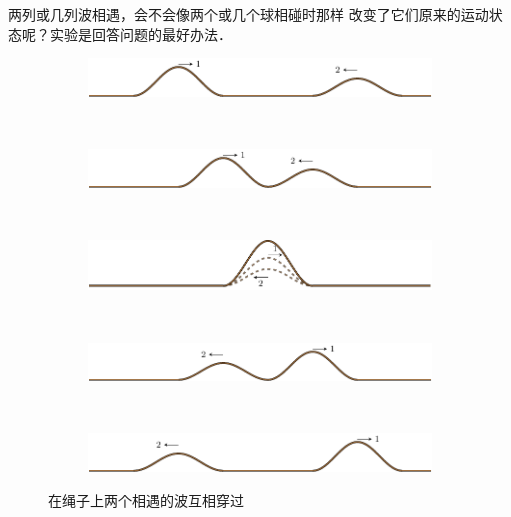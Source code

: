 两列或几列波相遇，会不会像两个或几个球相碰时那样
改变了它们原来的运动状态呢？实验是回答问题的最好办法．
\begin{figure}[htbp]
    \centering
    \begin{subfigure}{0.8\linewidth}
        \centering
        \includegraphics{fig/A/9-21a.pdf}
        \caption{}\label{fig_A_9-21a}
    \end{subfigure}
    \\
    \begin{subfigure}{0.8\linewidth}
        \centering
        \includegraphics{fig/A/9-21b.pdf}
        \caption{}\label{fig_A_9-21b}
    \end{subfigure}
    \\
    \begin{subfigure}{0.8\linewidth}
        \centering
        \includegraphics{fig/A/9-21c.pdf}
        \caption{}\label{fig_A_9-21c}
    \end{subfigure}
    \\
    \begin{subfigure}{0.8\linewidth}
        \centering
        \includegraphics{fig/A/9-21d.pdf}
        \caption{}\label{fig_A_9-21d}
    \end{subfigure}
    \\
    \begin{subfigure}{0.8\linewidth}
        \centering
        \includegraphics{fig/A/9-21e.pdf}
        \caption{}\label{fig_A_9-21e}
    \end{subfigure}
    \caption{在绳子上两个相遇的波互相穿过}\label{fig_A_9-21}
\end{figure}


